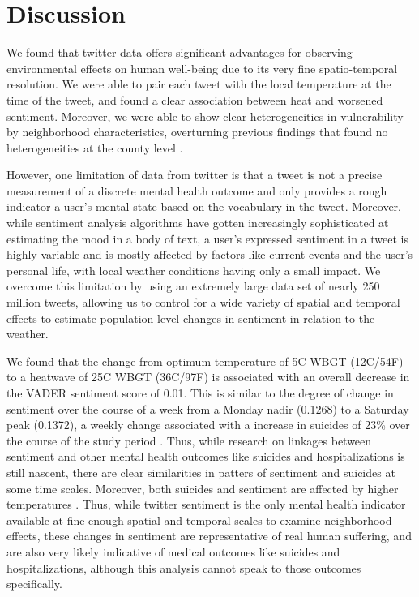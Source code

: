 \documentclass[fleqn,10pt]{wlscirep}
\begin{document}
\section*{Discussion}
We found that twitter data offers significant advantages for observing environmental effects on human well-being due to its very fine spatio-temporal resolution.  We were able to pair each tweet with the local temperature at the time of the tweet, and found a clear association between heat and worsened sentiment.   Moreover, we were able to show clear heterogeneities in vulnerability by neighborhood characteristics, overturning previous findings that found no heterogeneities at the county level \cite{Burke2018Aug, Mullins2019Dec}.

However, one limitation of data from twitter is that a tweet is not a precise measurement of a discrete mental health outcome and only provides a rough indicator a user's mental state based on the vocabulary in the tweet.  Moreover, while sentiment analysis algorithms have gotten increasingly sophisticated at estimating the mood in a body of text, a user's expressed sentiment in a tweet is highly variable and is mostly affected by factors like current events and the user's personal life, with local weather conditions having only a small impact.  We overcome this limitation by using an extremely large data set of nearly 250 million tweets, allowing us to control for a wide variety of spatial and temporal effects to estimate population-level changes in sentiment in relation to the weather.

We found that the change from optimum temperature of 5\textdegree C WBGT (12\textdegree C/54\textdegree F) to a heatwave of 25\textdegree C WBGT (36\textdegree C/97\textdegree F) is associated with an overall decrease in the VADER sentiment score of 0.01.  This is similar to the degree of change in sentiment over the course of a week from a Monday nadir (0.1268) to a Saturday peak (0.1372), a weekly change associated with a increase in suicides of 23\% over the course of the study period \cite{CDC2021}.  Thus, while research on linkages between sentiment and other mental health outcomes like suicides and hospitalizations is still nascent, there are clear similarities in patters of sentiment and suicides at some time scales.  Moreover, both suicides and sentiment are affected by higher temperatures \cite{baylis_weather_2018, Burke2018Aug}.  Thus, while twitter sentiment is the only mental health indicator available at fine enough spatial and temporal scales to examine neighborhood effects, these changes in sentiment are representative of real human suffering, and are also very likely indicative of medical outcomes like suicides and hospitalizations, although this analysis cannot speak to those outcomes specifically.
\end{document}
